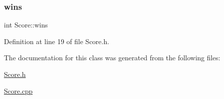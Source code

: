 \subsubsection{\texorpdfstring{wins}{wins}}
{\footnotesize\ttfamily int Score\+::wins\hspace{0.3cm}{\ttfamily [protected]}}



Definition at line 19 of file Score.\+h.



The documentation for this class was generated from the following files\+:\begin{DoxyCompactItemize}
\item 
\hyperlink{_score_8h}{Score.\+h}\item 
\hyperlink{_score_8cpp}{Score.\+cpp}\end{DoxyCompactItemize}
